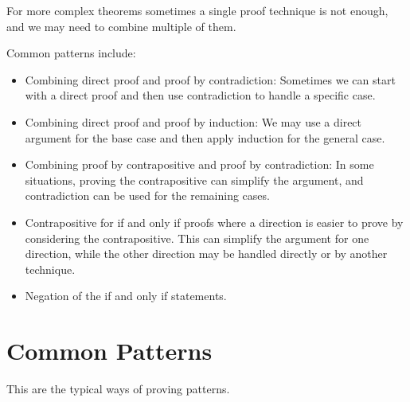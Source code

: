 For more complex theorems sometimes a single proof technique is not enough, and we may need to combine multiple of them.

Common patterns include:

\begin{itemize}

	\item Combining direct proof and proof by contradiction: Sometimes we can start with a direct proof and then use contradiction to handle a specific case.

	\item Combining direct proof and proof by induction: We may use a direct argument for the base case and then apply induction for the general case.

	\item Combining proof by contrapositive and proof by contradiction: In some situations, proving the contrapositive can simplify the argument, and contradiction can be used for the remaining cases.

	\item Contrapositive for if and only if proofs where a direction is easier to prove by considering the contrapositive. This can simplify the argument for one direction,
	      while the other direction may be handled directly or by another technique.

	\item Negation of the if and only if statements.

\end{itemize}

\section{Common Patterns}

This are the typical ways of proving patterns.

